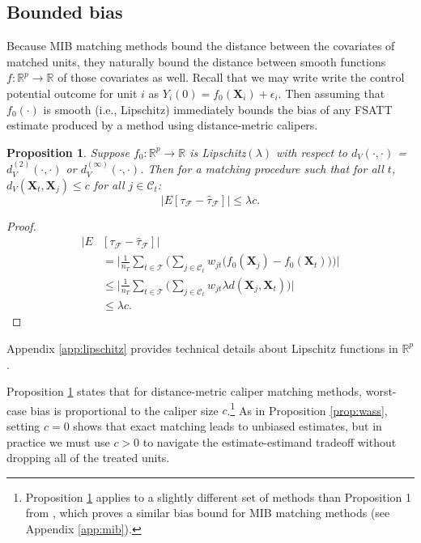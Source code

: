 \documentclass{article}
\newtheorem{proposition}[theorem]{Proposition}
\newcommand{\bX}{\mathbf{X}}
\newcommand{\Xt}{\mathbf{X}_t}
\newcommand{\Xj}{\mathbf{X}_j}
\newcommand{\R}{\mathbb{R}}
\newcommand{\Rp}{\mathbb{R}^p}
\newcommand{\Ct}{\mathcal{C}_{t}}
\begin{document}
\subsection{Bounded bias}
\label{sec:biasbd}

Because MIB matching methods bound the distance between the covariates of matched units, they naturally bound the distance between smooth functions $f:\Rp \to \R$ of those covariates as well.
Recall that we may write write the control potential outcome for unit $i$ as $Y_i(0) = f_0(\bX_i) + \epsilon_i$.
Then assuming that $f_0(\cdot)$ is smooth (i.e., Lipschitz) immediately bounds the bias of any FSATT estimate produced by a method using distance-metric calipers.
\begin{proposition}
\label{prop:biasbd_lip}
Suppose $f_0: \Rp \to \R$ is Lipschitz$(\lambda)$ with respect to $d_V(\cdot, \cdot)$ = $d^{(2)}_V(\cdot, \cdot)$ or $d^{(\infty)}_V(\cdot, \cdot)$.
Then for a matching procedure such that for all $t$, $d_V(\Xt, \Xj) \leq c$ for all $j \in \Ct$:
\begin{equation*}
    \big|E[\tau_\mathcal{F} - \hat{\tau}_\mathcal{F}] \big| \leq \lambda c.
\end{equation*}
\end{proposition}
\begin{proof}
    \begin{align*}
        \big| E &[\tau_\mathcal{F} - \hat{\tau}_\mathcal{F} ] \big| \\
        &= \bigg| \frac{1}{n_T} \sum_{t \in \mathcal{T}} 
            \Big( \sum_{j \in \Ct} w_{jt} \big(f_0(\Xj) - f_0(\Xt)\big) \Big) \bigg| \\
        &\leq \bigg| \frac{1}{n_T} \sum_{t \in \mathcal{T}} 
            \Big( \sum_{j \in \Ct} w_{jt} \lambda d(\Xj, \Xt) \Big) \bigg| \\
        &\leq \lambda c.
    \end{align*}
\end{proof}
Appendix \ref{app:lipschitz} provides technical details about Lipschitz functions in $\Rp$.

Proposition \ref{prop:biasbd_lip} states that for distance-metric caliper matching methods, worst-case bias is proportional to the caliper size $c$.\footnote{Proposition \ref{prop:biasbd_lip} applies to a slightly different set of methods than Proposition 1 from \citet{iacus2011multivariate}, which proves a similar bias bound for MIB matching methods (see Appendix \ref{app:mib}).}
As in Proposition \ref{prop:wass}, setting $c=0$ shows that exact matching leads to unbiased estimates, but in practice we must use $c > 0$ to navigate the estimate-estimand tradeoff without dropping all of the treated units.
\end{document}
